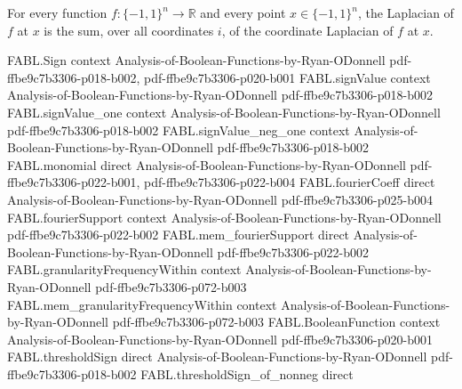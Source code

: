 \begin{theorem}
\label{FABL.laplacian_apply}
\leanok
{}
For every function $f:\{-1,1\}^n\to\mathbb R$ and every point $x\in\{-1,1\}^n$, the
Laplacian of $f$ at $x$ is the sum, over all coordinates $i$, of the coordinate
Laplacian of $f$ at $x$.
\end{theorem}

\begin{theorem}
\label{FABL.laplacian_eq_sum_sub_flip_div_two}
\leanok
{}
\proofstep
  {FABL.Sign}
  {context}
  {Analysis-of-Boolean-Functions-by-Ryan-ODonnell}
  {pdf-ffbe9c7b3306-p018-b002,
    pdf-ffbe9c7b3306-p020-b001}
\proofstep
  {FABL.signValue}
  {context}
  {Analysis-of-Boolean-Functions-by-Ryan-ODonnell}
  {pdf-ffbe9c7b3306-p018-b002}
\proofstep
  {FABL.signValue_one}
  {context}
  {Analysis-of-Boolean-Functions-by-Ryan-ODonnell}
  {pdf-ffbe9c7b3306-p018-b002}
\proofstep
  {FABL.signValue_neg_one}
  {context}
  {Analysis-of-Boolean-Functions-by-Ryan-ODonnell}
  {pdf-ffbe9c7b3306-p018-b002}
\proofstep
  {FABL.monomial}
  {direct}
  {Analysis-of-Boolean-Functions-by-Ryan-ODonnell}
  {pdf-ffbe9c7b3306-p022-b001,
    pdf-ffbe9c7b3306-p022-b004}
\proofstep
  {FABL.fourierCoeff}
  {direct}
  {Analysis-of-Boolean-Functions-by-Ryan-ODonnell}
  {pdf-ffbe9c7b3306-p025-b004}
\proofstep
  {FABL.fourierSupport}
  {context}
  {Analysis-of-Boolean-Functions-by-Ryan-ODonnell}
  {pdf-ffbe9c7b3306-p022-b002}
\proofstep
  {FABL.mem_fourierSupport}
  {direct}
  {Analysis-of-Boolean-Functions-by-Ryan-ODonnell}
  {pdf-ffbe9c7b3306-p022-b002}
\proofstep
  {FABL.granularityFrequencyWithin}
  {context}
  {Analysis-of-Boolean-Functions-by-Ryan-ODonnell}
  {pdf-ffbe9c7b3306-p072-b003}
\proofstep
  {FABL.mem_granularityFrequencyWithin}
  {context}
  {Analysis-of-Boolean-Functions-by-Ryan-ODonnell}
  {pdf-ffbe9c7b3306-p072-b003}
\proofstep
  {FABL.BooleanFunction}
  {context}
  {Analysis-of-Boolean-Functions-by-Ryan-ODonnell}
  {pdf-ffbe9c7b3306-p020-b001}
\proofstep
  {FABL.thresholdSign}
  {direct}
  {Analysis-of-Boolean-Functions-by-Ryan-ODonnell}
  {pdf-ffbe9c7b3306-p018-b002}
\proofstep
  {FABL.thresholdSign_of_nonneg}
  {direct}

\end{theorem}
